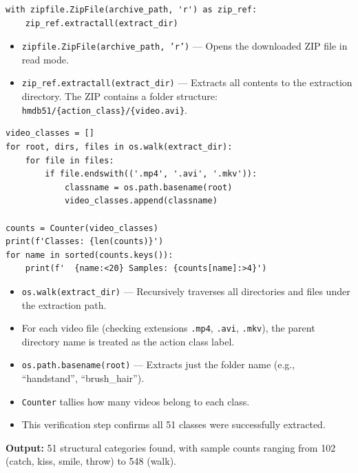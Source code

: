 \begin{lstlisting}
with zipfile.ZipFile(archive_path, 'r') as zip_ref:
    zip_ref.extractall(extract_dir)
\end{lstlisting}

\begin{explanation}
\begin{itemize}[nosep]
  \item \texttt{zipfile.ZipFile(archive\_path, 'r')} --- Opens the downloaded ZIP file in read mode.
  \item \texttt{zip\_ref.extractall(extract\_dir)} --- Extracts all contents to the extraction directory. The ZIP contains a folder structure: \texttt{hmdb51/\{action\_class\}/\{video.avi\}}.
\end{itemize}
\end{explanation}

\begin{lstlisting}
video_classes = []
for root, dirs, files in os.walk(extract_dir):
    for file in files:
        if file.endswith(('.mp4', '.avi', '.mkv')):
            classname = os.path.basename(root)
            video_classes.append(classname)

counts = Counter(video_classes)
print(f'Classes: {len(counts)}')
for name in sorted(counts.keys()):
    print(f'  {name:<20} Samples: {counts[name]:>4}')
\end{lstlisting}

\begin{explanation}
\begin{itemize}[nosep]
  \item \texttt{os.walk(extract\_dir)} --- Recursively traverses all directories and files under the extraction path.
  \item For each video file (checking extensions \texttt{.mp4}, \texttt{.avi}, \texttt{.mkv}), the parent directory name is treated as the action class label.
  \item \texttt{os.path.basename(root)} --- Extracts just the folder name (e.g., ``handstand'', ``brush\_hair'').
  \item \texttt{Counter} tallies how many videos belong to each class.
  \item This verification step confirms all 51 classes were successfully extracted.
\end{itemize}
\textbf{Output:} 51 structural categories found, with sample counts ranging from 102 (catch, kiss, smile, throw) to 548 (walk).
\end{explanation}

